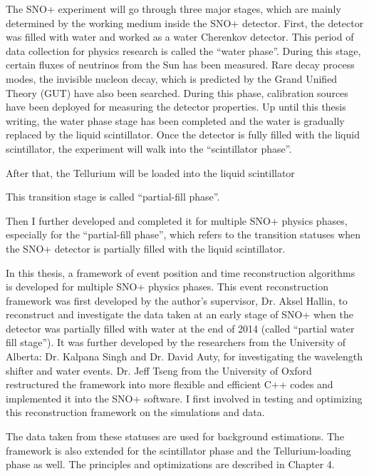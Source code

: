 The SNO+ experiment will go through three major stages, which are mainly determined by the working medium inside the SNO+ detector. First, the detector was filled with water and worked as a water Cherenkov detector. This period of data collection for physics research is called the ``water phase''. During this stage, certain fluxes of neutrinos from the Sun has been measured. Rare decay process modes, the invisible nucleon decay, which is predicted by the Grand Unified Theory (GUT) have also been searched. During this phase, calibration sources have been deployed for measuring the detector properties. Up until this thesis writing, the water phase stage has been completed and the water is gradually replaced by the liquid scintillator. Once the detector is fully filled with the liquid scintillator, the experiment will walk into the ``scintillator phase''.


After that, the Tellurium will be loaded into the liquid scintillator 


This transition stage is called ``partial-fill phase''.



Then I further developed and completed it for multiple SNO+ physics phases, especially for the ``partial-fill phase'', which refers to the transition statuses when the SNO+ detector is partially filled with the liquid scintillator.


In this thesis, a framework of event position and time reconstruction algorithms is developed for multiple SNO+ physics phases. This event reconstruction framework was first developed by the author's supervisor, Dr. Aksel Hallin, to reconstruct and investigate the data taken at an early stage of SNO+ when the detector was partially filled with water at the end of 2014 (called ``partial water fill stage'')\cite{partialWater}. It was further developed by the researchers from the University of Alberta: Dr. Kalpana Singh and Dr. David Auty, for investigating the wavelength shifter and water events\cite{davidPartialWater, kalpanaWLS, kalpanaWLS2, kalpanaMPFitter}. Dr. Jeff Tseng from the University of Oxford restructured the framework into more flexible and efficient C++ codes and implemented it into the SNO+ software\cite{jieMPW}. I first involved in testing and optimizing this reconstruction framework on the simulations and data.





 The data taken from these statuses are used for background estimations. The framework is also extended for the scintillator phase and the Tellurium-loading phase as well. The principles and optimizations are described in Chapter 4.



